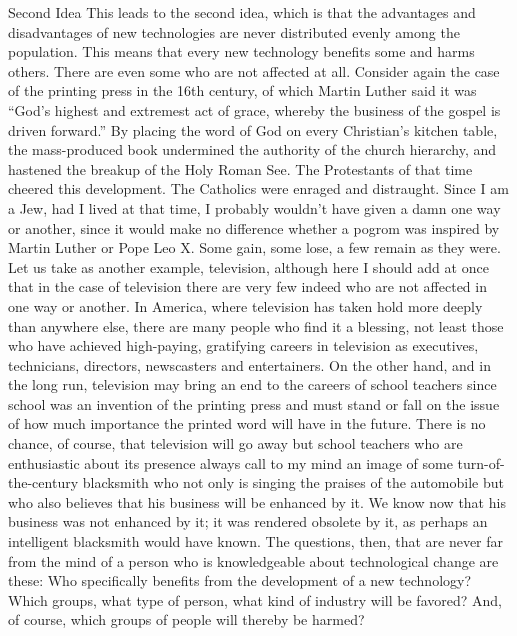 Second Idea
This leads to the second idea, which is that the advantages and disadvantages of new technologies are never
distributed evenly among the population. This means that every new technology benefits some and harms
others. There are even some who are not affected at all. Consider again the case of the printing press in the
16th century, of which Martin Luther said it was “God’s highest and extremest act of grace, whereby the
business of the gospel is driven forward.” By placing the word of God on every Christian’s kitchen table,
the mass-produced book undermined the authority of the church hierarchy, and hastened the breakup of the
Holy Roman See. The Protestants of that time cheered this development. The Catholics were enraged and
distraught. Since I am a Jew, had I lived at that time, I probably wouldn’t have given a damn one way or
another, since it would make no difference whether a pogrom was inspired by Martin Luther or Pope Leo X.
Some gain, some lose, a few remain as they were.
Let us take as another example, television, although here I should add at once that in the case of television
there are very few indeed who are not affected in one way or another. In America, where television has
taken hold more deeply than anywhere else, there are many people who find it a blessing, not least those
who have achieved high-paying, gratifying careers in television as executives, technicians, directors,
newscasters and entertainers. On the other hand, and in the long run, television may bring an end to the
careers of school teachers since school was an invention of the printing press and must stand or fall on the
issue of how much importance the printed word will have in the future. There is no chance, of course, that
television will go away but school teachers who are enthusiastic about its presence always call to my mind
an image of some turn-of-the-century blacksmith who not only is singing the praises of the automobile but
who also believes that his business will be enhanced by it. We know now that his business was not
enhanced by it; it was rendered obsolete by it, as perhaps an intelligent blacksmith would have known.
The questions, then, that are never far from the mind of a person who is knowledgeable about technological
change are these: Who specifically benefits from the development of a new technology? Which groups,
what type of person, what kind of industry will be favored? And, of course, which groups of people will
thereby be harmed?


